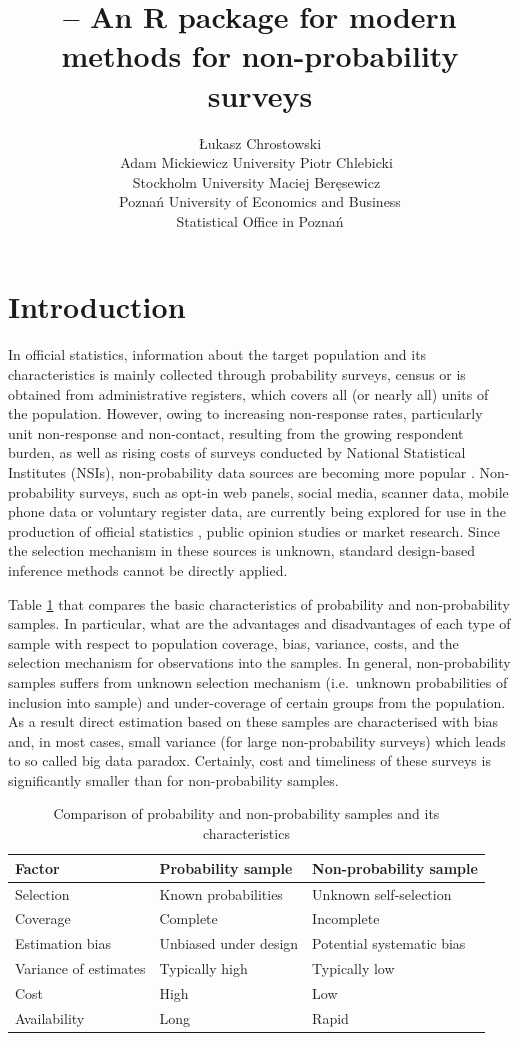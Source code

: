\documentclass[
]{jss}
\author{
Łukasz Chrostowski\\Adam Mickiewicz University \And Piotr
Chlebicki~\orcidlink{0009-0006-4867-7434}\\Stockholm University
\AND Maciej Beręsewicz~\orcidlink{0000-0002-8281-4301}\\Poznań
University of Economics and Business\\
Statistical Office in Poznań
}
\title{\pkg{nonprobsvy} -- An R package for modern methods for
non-probability surveys}
\begin{document}
\section{Introduction}\label{sec-introduction}

In official statistics, information about the target population and its
characteristics is mainly collected through probability surveys, census
or is obtained from administrative registers, which covers all (or
nearly all) units of the population. However, owing to increasing
non-response rates, particularly unit non-response and non-contact,
resulting from the growing respondent burden, as well as rising costs of
surveys conducted by National Statistical Institutes (NSIs),
non-probability data sources are becoming more popular
\citep{berkesewicz2017two, beaumont2020probability}. Non-probability
surveys, such as opt-in web panels, social media, scanner data, mobile
phone data or voluntary register data, are currently being explored for
use in the production of official statistics
\citep{citro2014multiple,daas2015big}, public opinion studies or market
research. Since the selection mechanism in these sources is unknown,
standard design-based inference methods cannot be directly applied.

Table \ref{tab-comparison-characteristics} that compares the basic
characteristics of probability and non-probability samples. In
particular, what are the advantages and disadvantages of each type of
sample with respect to population coverage, bias, variance, costs, and
the selection mechanism for observations into the samples. In general,
non-probability samples suffers from unknown selection mechanism
(i.e.~unknown probabilities of inclusion into sample) and under-coverage
of certain groups from the population. As a result direct estimation
based on these samples are characterised with bias and, in most cases,
small variance (for large non-probability surveys) which leads to so
called big data paradox. Certainly, cost and timeliness of these surveys
is significantly smaller than for non-probability samples.

\begin{table}[ht!]
    \centering
    \begin{tabular}{lll}
    \hline
    \textbf{Factor}   &  \textbf{Probability sample} & \textbf{Non-probability sample}\\
    \hline
    Selection & Known probabilities & Unknown self-selection \\
    Coverage & Complete & Incomplete \\
    Estimation bias & Unbiased under design & Potential systematic bias \\
    Variance of estimates & Typically high & Typically low \\
    Cost & High & Low \\
    Availability & Long & Rapid \\
    \hline
    \end{tabular}
    \caption{Comparison of probability and non-probability samples and its characteristics}
    \label{tab-comparison-characteristics}
\end{table}
\end{document}
